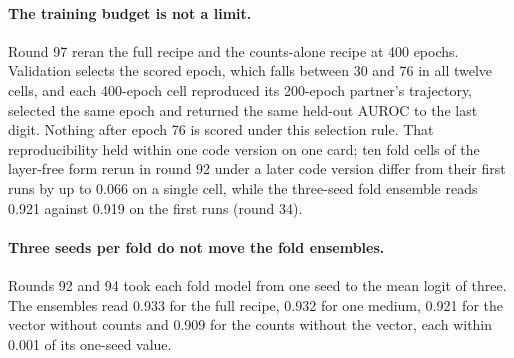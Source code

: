 \paragraph{The training budget is not a limit.} Round 97 reran the full recipe and the
counts-alone recipe at 400 epochs. Validation selects the scored epoch, which falls
between 30 and 76 in all twelve cells, and each 400-epoch cell reproduced its 200-epoch
partner's trajectory, selected the same epoch and returned the same held-out AUROC to the
last digit. Nothing after epoch 76 is scored under this selection rule. That
reproducibility held within one code version on one card; ten fold cells of the
layer-free form rerun in round 92 under a later code version differ from their first runs
by up to 0.066 on a single cell, while the three-seed fold ensemble reads 0.921 against
0.919 on the first runs (round 34).

\paragraph{Three seeds per fold do not move the fold ensembles.} Rounds 92 and 94 took
each fold model from one seed to the mean logit of three. The ensembles read 0.933 for
the full recipe, 0.932 for one medium, 0.921 for the vector without counts and 0.909 for
the counts without the vector, each within 0.001 of its one-seed value.



